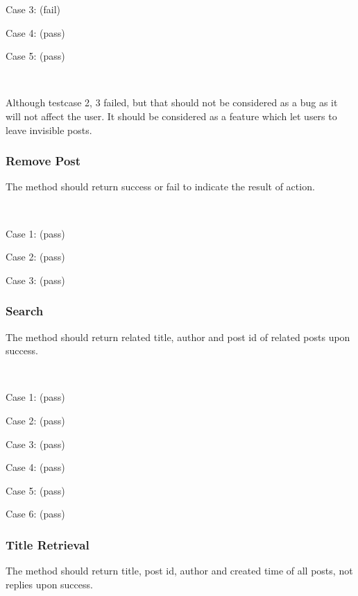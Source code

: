 Case 3: (fail)


Case 4: (pass)


Case 5: (pass)


~

Although testcase 2, 3 failed, but that should not be considered as a bug as it will not affect the user. It should be considered as a feature which let users to leave invisible posts.

\subsubsection{Remove Post}
The method should return success or fail to indicate the result of action.

~

Case 1: (pass)


Case 2: (pass)


Case 3: (pass)


\subsubsection{Search}
The method should return related title, author and post id of related posts upon success.

~

Case 1: (pass)


Case 2: (pass)


Case 3: (pass)


Case 4: (pass)


Case 5: (pass)


Case 6: (pass)


\subsubsection{Title Retrieval}
The method should return title, post id, author and created time of all posts, not replies upon success.

